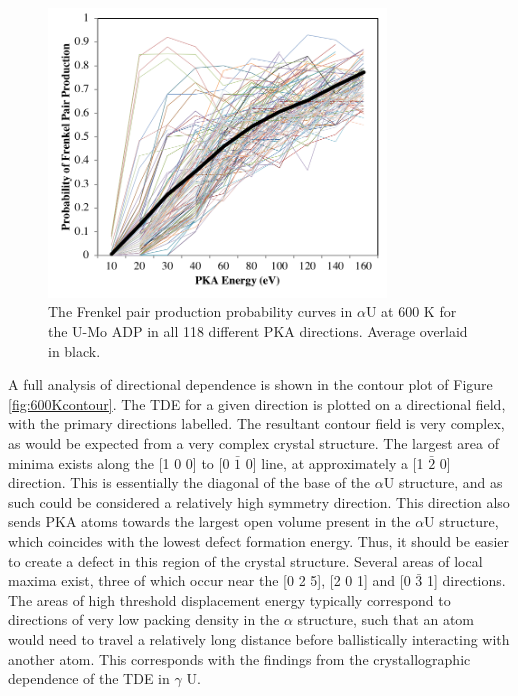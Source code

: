 \documentclass[review]{elsarticle}
\providecommand{\DIFaddbeginFL}{} %
\providecommand{\DIFaddendFL}{} %
\providecommand{\DIFdelbeginFL}{} %
\providecommand{\DIFdelendFL}{} %
\newcommand{\DIFscaledelfig}{0.5}
\newlength{\DIFdelgraphicswidth} %
\newlength{\DIFdelgraphicsheight} %
\newcommand{\DIFaddincludegraphics}[2][]{{\color{blue}\fbox{\DIFOincludegraphics[#1]{#2}}}} %
\newcommand{\DIFdelincludegraphics}[2][]{%
\sbox{\DIFdelgraphicsbox}{\DIFOincludegraphics[#1]{#2}}%
\settoboxwidth{\DIFdelgraphicswidth}{\DIFdelgraphicsbox} %
\settoboxtotalheight{\DIFdelgraphicsheight}{\DIFdelgraphicsbox} %
\scalebox{\DIFscaledelfig}{%
\parbox[b]{\DIFdelgraphicswidth}{\usebox{\DIFdelgraphicsbox}\\[-\baselineskip] \rule{\DIFdelgraphicswidth}{0em}}\llap{\resizebox{\DIFdelgraphicswidth}{\DIFdelgraphicsheight}{%
\setlength{\unitlength}{\DIFdelgraphicswidth}%
\begin{picture}(1,1)%
\thicklines\linethickness{2pt} %
{\color[rgb]{1,0,0}\put(0,0){\framebox(1,1){}}}%
{\color[rgb]{1,0,0}\put(0,0){\line( 1,1){1}}}%
{\color[rgb]{1,0,0}\put(0,1){\line(1,-1){1}}}%
\end{picture}%
}\hspace*{3pt}}} %
} %
\DeclareRobustCommand{\DIFaddbeginFL}{\DIFOaddbeginFL \let\includegraphics\DIFaddincludegraphics} %
\DeclareRobustCommand{\DIFaddendFL}{\DIFOaddendFL \let\includegraphics\DIFOincludegraphics} %
\DeclareRobustCommand{\DIFdelbeginFL}{\DIFOdelbeginFL \let\includegraphics\DIFdelincludegraphics} %
\DeclareRobustCommand{\DIFdelendFL}{\DIFOaddendFL \let\includegraphics\DIFOincludegraphics} %
\begin{document}
\begin{figure}[h]
 \centering
 \DIFdelbeginFL %
\DIFdelendFL \DIFaddbeginFL \includegraphics[width=0.8\textwidth]{ed_dir_allF_alpha.png} 
 \DIFaddendFL \caption{The Frenkel pair production probability curves in $\alpha$U at 600 K for the U-Mo ADP in all 118 different PKA directions. Average overlaid in black.}
 \label{fig:ed_diralpha}
\end{figure}

\FloatBarrier

A full analysis of directional dependence is shown in the contour plot of Figure \ref{fig:600Kcontour}. The TDE for a given direction is plotted on a directional field, with the primary directions labelled. The resultant contour field is very complex, as would be expected from a very complex crystal structure. The largest area of minima exists along the [1 0 0] to [0 $\bar{1}$ 0] line, at approximately a [1 $\bar{2}$ 0] direction. This is essentially the diagonal of the base of the $\alpha$U structure, and as such could be considered a relatively high symmetry direction. This direction also sends PKA atoms towards the largest open volume present in the $\alpha$U structure, which coincides with the lowest defect formation energy. Thus, it should be easier to create a defect in this region of the crystal structure. Several areas of local maxima exist, three of which occur near the [0 2 5], [2 0 1] and [0 $\bar{3}$ 1] directions. The areas of high threshold displacement energy typically correspond to directions of very low packing density in the $\alpha$ structure, such that an atom would need to travel a relatively long distance before ballistically interacting with another atom. This corresponds with the findings from the crystallographic dependence of the TDE in $\gamma$ U. 
\end{document}
